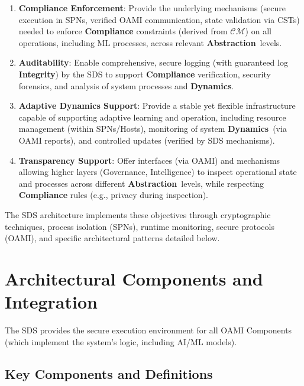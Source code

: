 \documentclass[12pt,a4paper]{report}
\newcommand{\Integrity}{\textbf{Integrity}}
\newcommand{\Abstraction}{\textbf{Abstraction}}
\newcommand{\Dynamics}{\textbf{Dynamics}}
\begin{document}
\begin{enumerate}[noitemsep]
		\item \textbf{Compliance Enforcement}: Provide the underlying mechanisms (secure execution in SPNs, verified OAMI communication, state validation via CSTs) needed to enforce \textbf{Compliance} constraints (derived from $\mathcal{CM}$) on all operations, including ML processes, across relevant \Abstraction\ levels.
		\item \textbf{Auditability}: Enable comprehensive, secure logging (with guaranteed log \Integrity) by the SDS to support \textbf{Compliance} verification, security forensics, and analysis of system processes and \Dynamics.
		\item \textbf{Adaptive Dynamics Support}: Provide a stable yet flexible infrastructure capable of supporting adaptive learning and operation, including resource management (within SPNs/Hosts), monitoring of system \Dynamics\ (via OAMI reports), and controlled updates (verified by SDS mechanisms).
		\item \textbf{Transparency Support}: Offer interfaces (via OAMI) and mechanisms allowing higher layers (Governance, Intelligence) to inspect operational state and processes across different \Abstraction\ levels, while respecting \textbf{Compliance} rules (e.g., privacy during inspection).
	\end{enumerate}
	The SDS architecture implements these objectives through cryptographic techniques, process isolation (SPNs), runtime monitoring, secure protocols (OAMI), and specific architectural patterns detailed below.
	
	\section{Architectural Components and Integration} %
	\label{sec:4-2} %
	
	The SDS provides the secure execution environment for all OAMI Components (which implement the system's logic, including AI/ML models).
	
	\subsection{Key Components and Definitions} %
	\label{sec:4-2-1} %
	
\end{document}
